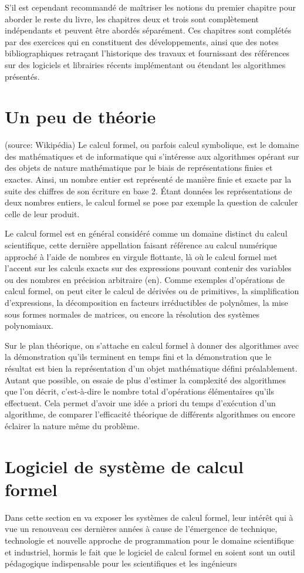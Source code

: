 \documentclass[11pt,fleqn]{book} %
\begin{document}
S'il est cependant recommandé de maîtriser les notions du premier chapitre pour aborder le reste du livre, les chapitres deux et trois sont complètement indépendants et peuvent être abordés séparément. Ces chapitres sont complétés par des exercices qui en constituent des développements, ainsi que des notes bibliographiques retraçant l'historique des travaux et fournissant des références sur des logiciels et librairies récents implémentant ou étendant les algorithmes présentés. 

\section{Un peu de théorie}(source: Wikipédia)
Le calcul formel, ou parfois calcul symbolique, est le domaine des mathématiques et de informatique qui s'intéresse aux algorithmes opérant sur des objets de nature mathématique par le biais de représentations finies et exactes. Ainsi, un nombre entier est représenté de manière finie et exacte par la suite des chiffres de son écriture en base 2. Étant données les représentations de deux nombres entiers, le calcul formel se pose par exemple la question de calculer celle de leur produit.

Le calcul formel est en général considéré comme un domaine distinct du calcul scientifique, cette dernière appellation faisant référence au calcul numérique approché à l'aide de nombres en virgule flottante, là où le calcul formel met l'accent sur les calculs exacts sur des expressions pouvant contenir des variables ou des nombres en précision arbitraire (en). Comme exemples d'opérations de calcul formel, on peut citer le calcul de dérivées ou de primitives, la simplification d'expressions, la décomposition en facteurs irréductibles de polynômes, la mise sous formes normales de matrices, ou encore la résolution des systèmes polynomiaux.

Sur le plan théorique, on s'attache en calcul formel à donner des algorithmes avec la démonstration qu'ils terminent en temps fini et la démonstration que le résultat est bien la représentation d'un objet mathématique défini préalablement. Autant que possible, on essaie de plus d'estimer la complexité des algorithmes que l'on décrit, c'est-à-dire le nombre total d'opérations élémentaires qu'ils effectuent. Cela permet d'avoir une idée a priori du temps d'exécution d'un algorithme, de comparer l'efficacité théorique de différents algorithmes ou encore éclairer la nature même du problème.
\section{Logiciel de système de calcul formel}
Dans cette section en va exposer les systèmes de calcul formel, leur intérêt qui à vue un renouveau ces dernières années à cause de l'émergence de technique, technologie et nouvelle approche de programmation pour le domaine scientifique et industriel, hormis le fait que le logiciel de calcul formel en soient sont un outil pédagogique 
indispensable pour les scientifiques et les ingénieurs
\end{document}
